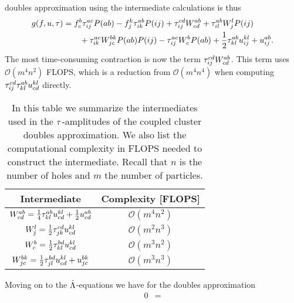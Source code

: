         doubles approximation using the intermediate calculations is thus
        \begin{align}
            g(f, u, \tau)
            &=
            f^{b}_{c} \tau^{ac}_{ij} P(ab)
            - f^{k}_{j} \tau^{ab}_{ik} P(ij)
            + \tau^{cd}_{ij} W^{ab}_{cd}
            + \tau^{ab}_{il} W^{l}_{j} P(ij)
            \nonumber \\
            &\qquad
            + \tau^{ac}_{ik} W^{bk}_{jc} P(ab) P(ij)
            - \tau^{ac}_{ij} W^{b}_{c} P(ab)
            + \frac{1}{2} \tau^{ab}_{kl} u^{kl}_{ij}
            + u^{ab}_{ij}.
        \end{align}
        The most time-consuming contraction is now the term $\tau^{cd}_{ij}
        W^{ab}_{cd}$. This term uses $\mathcal{O}(m^4 n^2)$ FLOPS, which is a
        reduction from $\mathcal{O}(m^4 n^4)$ when computing $\tau^{cd}_{ij}
        \tau^{ab}_{kl} u^{kl}_{cd}$ directly.

        \begin{table}
            \centering
            \caption{In this table we summarize the intermediates used in
            the $\tau$-amplitudes of the coupled cluster doubles approximation. We
            also list the computational complexity in FLOPS needed to construct
            the intermediate. Recall that $n$ is the number of holes and $m$ the
            number of particles.}
            \begin{tabular}{cc}
                Intermediate & Complexity [FLOPS] \\
                \midrule
                $W^{ab}_{cd}
                = \frac{1}{4} \tau^{ab}_{kl} u^{kl}_{cd}
                + \frac{1}{2} u^{ab}_{cd}$
                &
                $\mathcal{O}(m^4 n^2)$ \\
                \addlinespace
                $W^{l}_{j}
                = \frac{1}{2} \tau^{cd}_{jk} u^{kl}_{cd}$
                &
                $\mathcal{O}(m^2 n^3)$
                \\
                \addlinespace
                $W^{b}_{c}
                = \frac{1}{2} \tau^{bd}_{kl} u^{kl}_{cd}$
                &
                $\mathcal{O}(m^3 n^2)$
                \\
                \addlinespace
                $W^{bk}_{jc}
                = \frac{1}{2} \tau^{bd}_{jl} u^{kl}_{cd}
                + u^{bk}_{jc}$
                &
                $\mathcal{O}(m^3n^3)$
            \end{tabular}
            \label{tab:intermediates_ccd}
        \end{table}
        Moving on to the $\hat{\Lambda}$-equations we have for the doubles
        approximation
        \begin{align}
            0 &=
        \end{align}

